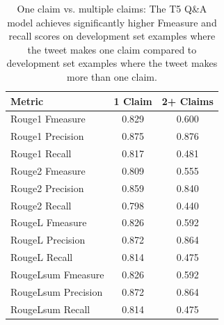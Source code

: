 \documentclass[11pt]{article}
\begin{document}
\begin{table}[hbt!]
\begin{tabular}{l c c}
\hline
\textbf{Metric} & \textbf{1 Claim} & \textbf{2+ Claims}\\
\hline
Rouge1 Fmeasure & 0.829 & 0.600\\
\phantom{X}Rouge1 Precision & 0.875 & 0.876\\
\phantom{X}Rouge1 Recall & 0.817 & 0.481\\
Rouge2 Fmeasure & 0.809 & 0.555\\
\phantom{X}Rouge2 Precision & 0.859 & 0.840\\
\phantom{X}Rouge2 Recall & 0.798 & 0.440\\
RougeL Fmeasure & 0.826 & 0.592\\
\phantom{X}RougeL Precision & 0.872 & 0.864\\
\phantom{X}RougeL Recall & 0.814 & 0.475\\
RougeLsum Fmeasure & 0.826 & 0.592\\
\phantom{X}RougeLsum Precision & 0.872 & 0.864\\
\phantom{X}RougeLsum Recall & 0.814 & 0.475\\
\hline
\end{tabular}

\caption{One claim vs. multiple claims: The T5 Q\&A model achieves significantly higher Fmeasure and recall scores on development set examples where the tweet makes one claim compared to development set examples where the tweet makes more than one claim.}
\label{tab appendix seq2seq: claims}
\end{table}
\end{document}
